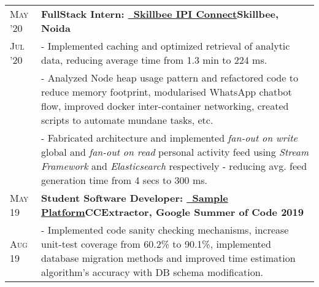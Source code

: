 \documentclass[a4paper,10pt]{extarticle} %
\begin{document}
\begin{tabularx}{\linewidth}{ l | X }


\textsc{May '20} & \textbf{FullStack Intern: {\href{https://skillbee.com/}{\ Skillbee IPI Connect}}}\hfill\textbf{Skillbee, Noida}\\
\textsc{Jul '20}& {- Implemented caching and optimized retrieval of analytic data, reducing average time from 1.3 min to 224 ms.}\\
& {- Analyzed Node heap usage pattern and refactored code to reduce memory footprint, modularised WhatsApp chatbot flow, improved docker inter-container networking, created scripts to automate mundane tasks, etc.}\\
& {- Fabricated architecture and implemented \textit{fan-out on write} global and \textit{fan-out on read} personal activity feed using \textit{Stream Framework} and \textit{Elasticsearch} respectively - reducing avg. feed generation time from 4 secs to 300 ms.}\\[2mm]

\textsc{May 19} & \textbf{Student Software Developer: {\href{https://github.com/CCExtractor/sample-platform}{\ Sample Platform}}}\hfill\textbf{CCExtractor, Google Summer of Code 2019}\\
\textsc{Aug 19}& {- Implemented code sanity checking mechanisms, increase unit-test coverage from 60.2\% to 90.1\%, implemented database migration methods and improved time estimation algorithm's accuracy with DB schema modification.}\\[2mm]


\end{tabularx}
\end{document}
